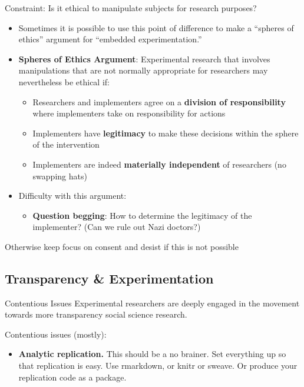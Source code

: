 \documentclass[
  11pt,
  ignorenonframetext,
]{beamer}
\providecommand{\tightlist}{%
  \setlength{\itemsep}{0pt}\setlength{\parskip}{0pt}}\usepackage{longtable,booktabs,array}
\begin{document}
\begin{frame}{Constraint: Is it ethical to manipulate subjects for
research purposes?}
\protect\hypertarget{constraint-is-it-ethical-to-manipulate-subjects-for-research-purposes-1}{}
\begin{itemize}
\item
  Sometimes it is possible to use this point of difference to make a
  ``spheres of ethics'' argument for ``embedded experimentation.''
\item
  \textbf{Spheres of Ethics Argument}: Experimental research that
  involves manipulations that are not normally appropriate for
  researchers may nevertheless be ethical if:

  \begin{itemize}
  \tightlist
  \item
    Researchers and implementers agree on a \textbf{division of
    responsibility} where implementers take on responsibility for
    actions
  \item
    Implementers have \textbf{legitimacy} to make these decisions within
    the sphere of the intervention
  \item
    Implementers are indeed \textbf{materially independent} of
    researchers (no swapping hats)
  \end{itemize}
\item
  Difficulty with this argument:

  \begin{itemize}
  \tightlist
  \item
    \textbf{Question begging}: How to determine the legitimacy of the
    implementer? (Can we rule out Nazi doctors?)
  \end{itemize}
\end{itemize}

Otherwise keep focus on consent and desist if this is not possible
\end{frame}

\hypertarget{transparency-experimentation}{%
\subsection{\texorpdfstring{Transparency \& Experimentation
\label{registeration}}{Transparency \& Experimentation }}\label{transparency-experimentation}}

\begin{frame}{Contentious Issues}
\protect\hypertarget{contentious-issues}{}
Experimental researchers are deeply engaged in the movement towards more
transparency social science research.

Contentious issues (mostly):

\begin{itemize}
\tightlist
\item
  \textbf{Analytic replication.} This should be a no brainer. Set
  everything up so that replication is easy. Use rmarkdown, or knitr or
  sweave. Or produce your replication code as a package.
\end{itemize}
\end{frame}
\end{document}
